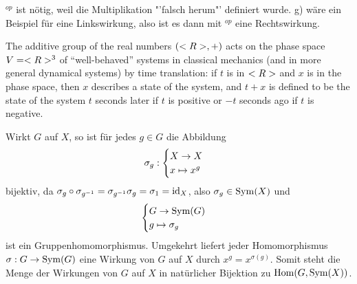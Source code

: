 \begin{*anmerkung}
	$^{op}$ ist nötig, weil die Multiplikation "'falsch herum"' definiert wurde. g) wäre ein Beispiel für eine Linkswirkung, also ist es dann mit $^{op}$ eine Rechtswirkung.
\end{*anmerkung}

\begin{*example}
	The additive group of the real numbers $(<R>, +)$ acts on the phase space $V = <R>^3$ of ``well-behaved'' systems in classical mechanics (and in more general dynamical systems) by time translation: if $t$ is in $<R>$ and $x$ is in the phase space, then $x$ describes a state of the system, and $t + x$ is defined to be the state of the system $t$ seconds later if $t$ is positive or $-t$ seconds ago if $t$ is negative.
\end{*example}

\begin{remark}
	Wirkt $G$ auf $X$, so ist für jedes $g\in G$ die Abbildung
	\begin{align}
		\sigma_g: \begin{cases}
			X\to X \\ x\mapsto x^g
		\end{cases} \notag
	\end{align}
	bijektiv, da $\sigma_g\circ\sigma_{g^{-1}}=\sigma_{g^{-1}}\sigma_g=\sigma_1=\operatorname{id}_X$, also $\sigma_g\in\operatorname{Sym}(X)$ und
	\begin{align}
		\begin{cases}
			G\to \operatorname{Sym}(G) \\ g\mapsto \sigma_g
		\end{cases}\notag
	\end{align}
	ist ein Gruppenhomomorphismus. Umgekehrt liefert jeder Homomorphismus $\sigma: G\to\operatorname{Sym}(G)$ eine Wirkung von $G$ auf $X$ durch $x^g=x^{\sigma(g)}$. Somit steht die Menge der Wirkungen von $G$ auf $X$ in natürlicher Bijektion zu $\operatorname{Hom}(G,\operatorname{Sym}(X))$.
\end{remark}

